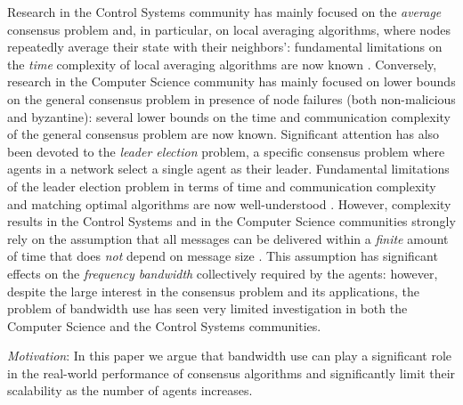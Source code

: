 \documentclass[letterpaper,10pt,conference]{ieeeconf}
\begin{document}
Research in the Control Systems community has mainly focused on the \emph{average} consensus problem and, in particular, on local averaging algorithms, where nodes repeatedly average their state with their neighbors': fundamental limitations on the \emph{time} complexity of local averaging algorithms are now known \cite{AO-JNT:07}.
Conversely, research in the Computer Science community has mainly focused on lower bounds on the general consensus problem in presence of node failures (both non-malicious and byzantine): several lower bounds on the time and communication complexity of the general consensus problem are now known. Significant attention has also been devoted to the  \emph{leader election} problem, a specific consensus problem where agents in a network select a single agent as their leader. Fundamental limitations of the leader election problem in terms of time and communication complexity and matching optimal algorithms are now well-understood \cite{NL:96}.
However, complexity results in the Control Systems and in the Computer Science communities strongly rely on the assumption that all messages can be delivered within a \emph{finite} amount of time that does \emph{not} depend on message size \cite{NL:96}. This assumption has significant effects on the \emph{frequency bandwidth} collectively required by the agents: however, despite the large interest in the consensus problem and its applications, the problem of bandwidth use has seen very limited investigation in both the Computer Science and the Control Systems communities. 

\emph{Motivation}:
In this paper we argue that bandwidth use can play a significant role in the real-world performance of consensus algorithms and significantly limit their scalability as the number of agents increases.
\end{document}
